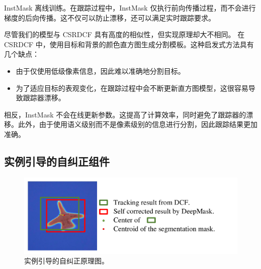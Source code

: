InstMask 离线训练。在跟踪过程中，InstMask 仅执行前向传播过程，而不会进行梯度的后向传播。这不仅可以防止漂移，还可以满足实时跟踪要求。

尽管我们的模型与 CSRDCF \cite{Lukezic2017DiscriminativeCF} 具有高度的相似性，但实现原理却大不相同。
在 CSRDCF \cite{Lukezic2017DiscriminativeCF} 中，使用目标和背景的颜色直方图生成分割模板。这种启发式方法具有几个缺点：

\begin{itemize}
\item 由于仅使用低级像素信息，因此难以准确地分割目标。
\item 为了适应目标的表观变化，在跟踪过程中会不断更新直方图模型，这很容易导致跟踪器漂移。
\end{itemize}

相反，InstMask 不会在线更新参数。这提高了计算效率，同时避免了跟踪器的漂移。此外，由于使用语义级别而不是像素级别的信息进行分割，因此跟踪结果更加准确。

\subsection{实例引导的自纠正组件} \label{sec:cog}

\begin{figure}[t]
    \centering
    \includegraphics[width=1.0\textwidth]{Img/IGCF/cog_arch.pdf}
    \caption{实例引导的自纠正原理图。}
    \label{fig:net}
\end{figure}

